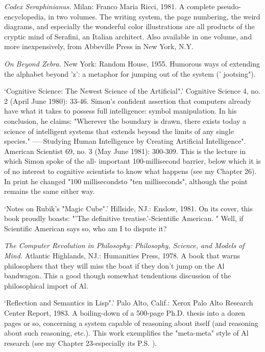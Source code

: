  {\sl Codex Seraphinianus.} Milan: Franco Maria Ricci, 1981. A complete pseudo- encyclopedia, in two volumes. The writing system, the page numbering, the weird diagrams, and especially the wonderful color illustrations are all products of the cryptic mind of Serafini, an Italian architect. Also available in one volume, and more inexpensively, from Abbeville Press in New York, N.Y.

 {\sl On Beyond Zebra.} New York: Random House, 1955. Humorous ways of extending the alphabet beyond 'z': a metaphor for jumping out of the system (' jootsing").

 `Cognitive Science: The Newest Science of the Artificial".' Cognitive Science 4, no. 2 (April June 1980): 33-46. Simon's confident assertion that computers already have what it takes to possess full intelligence: symbol manipulation. In his conclusion, he claims: "Wherever the boundary is drawn, there exists today a science of intelligent systems that extends beyond the limits of any single species." -----Studying Human Intelligence by Creating Artificial Intelligence". American Scientist 69, no. 3 (May June 1981): 300-309. This is the lecture in which Simon spoke of the all- important 100-millisecond barrier, below which it is of no interest to cognitive scientists to know what happens (see my Chapter 26). In print he changed "100 millisecondsto "ten milliseconds", although the point remains the same either way.

 `Notes on Rubik's "Magic Cube".' Hillside, NJ.: Enslow, 1981. On its cover, this book proudly boasts: "'The definitive treatise.'-Scientific American. " Well, if Scientific American says so, who am I to dispute it?

 {\sl The Computer Revolution in Philosophy: Philosophy, Science, and Models of Mind.} Atlantic Highlands, NJ.: Humanities Press, 1978. A book that warns philosophers that they will miss the boat if they don't jump on the Al bandwagon. This a good though somewhat tendentious discussion of the philosophical import of Al.

 `Reflection and Semantics in Lisp".' Palo Alto, Calif.: Xerox Palo Alto Research Center Report, 1983. A boiling-down of a 500-page Ph.D. thesis into a dozen pages or so, concerning a system capable of reasoning about itself (and reasoning about such reasoning, etc.). This work exemplifies the "meta-meta" style of Al research (see my Chapter 23-especially its P.S. ).

